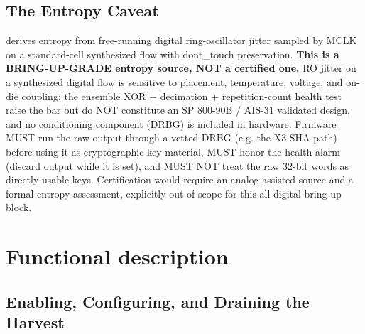 \subsection{The Entropy Caveat}

\noindent\colorbox{tablehighlightcolor}{%
	\begin{minipage}{0.97\textwidth}
	\vspace{0.3em}
	 derives entropy from free-running digital ring-oscillator jitter sampled by MCLK on a standard-cell synthesized flow with dont\_touch preservation. \textbf{This is a BRING-UP-GRADE entropy source, NOT a certified one.} RO jitter on a synthesized digital flow is sensitive to placement, temperature, voltage, and on-die coupling; the ensemble XOR + decimation + repetition-count health test raise the bar but do NOT constitute an SP 800-90B / AIS-31 validated design, and no conditioning component (DRBG) is included in hardware. Firmware MUST run the raw output through a vetted DRBG (e.g. the X3 SHA path) before using it as cryptographic key material, MUST honor the  health alarm (discard output while it is set), and MUST NOT treat the raw 32-bit words as directly usable keys. Certification would require an analog-assisted source and a formal entropy assessment, explicitly out of scope for this all-digital bring-up block.
	\vspace{0.3em}
	\end{minipage}%
}

\section{Functional description}

\subsection{Enabling, Configuring, and Draining the Harvest}

